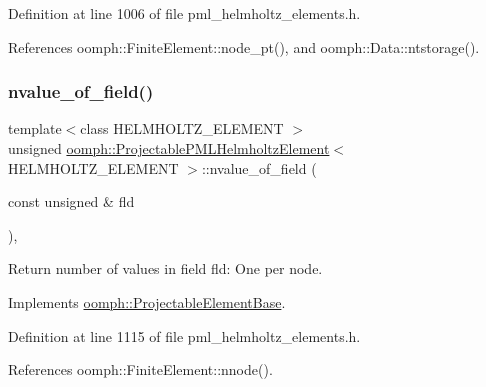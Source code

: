 Definition at line 1006 of file pml\+\_\+helmholtz\+\_\+elements.\+h.



References oomph\+::\+Finite\+Element\+::node\+\_\+pt(), and oomph\+::\+Data\+::ntstorage().

\mbox{\label{classoomph_1_1ProjectablePMLHelmholtzElement_a08c9eee991edbaff38b8df1682e49a8e}} 
\subsubsection{\texorpdfstring{nvalue\+\_\+of\+\_\+field()}{nvalue\_of\_field()}}
{\footnotesize\ttfamily template$<$class H\+E\+L\+M\+H\+O\+L\+T\+Z\+\_\+\+E\+L\+E\+M\+E\+NT $>$ \\
unsigned \hyperlink{classoomph_1_1ProjectablePMLHelmholtzElement}{oomph\+::\+Projectable\+P\+M\+L\+Helmholtz\+Element}$<$ H\+E\+L\+M\+H\+O\+L\+T\+Z\+\_\+\+E\+L\+E\+M\+E\+NT $>$\+::nvalue\+\_\+of\+\_\+field (\begin{DoxyParamCaption}\item[{const unsigned \&}]{fld }\end{DoxyParamCaption})\hspace{0.3cm}{\ttfamily [inline]}, {\ttfamily [virtual]}}



Return number of values in field fld\+: One per node. 



Implements \hyperlink{classoomph_1_1ProjectableElementBase_a1a9a6de16f3511bca8e8be770abb9c2e}{oomph\+::\+Projectable\+Element\+Base}.



Definition at line 1115 of file pml\+\_\+helmholtz\+\_\+elements.\+h.



References oomph\+::\+Finite\+Element\+::nnode().

\mbox{\label{classoomph_1_1ProjectablePMLHelmholtzElement_afc31f9a26ca4d6ac5089ef430139c380}} 
